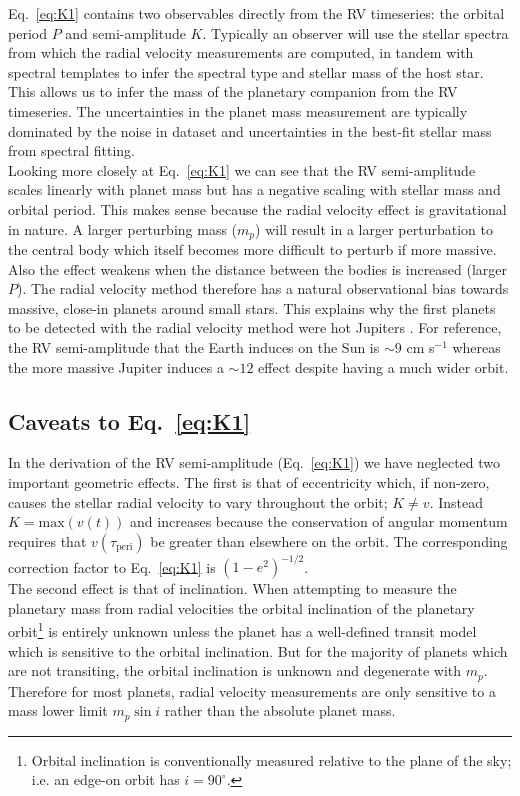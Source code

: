 Eq.~\ref{eq:K1} contains two observables directly from the RV timeseries: the orbital 
period $P$ and semi-amplitude $K$. Typically an observer will use the stellar spectra 
from which the radial velocity measurements are computed, in tandem with spectral 
templates to infer the spectral type and stellar mass of the host star. This allows 
us to infer the mass of the planetary companion from the RV timeseries. The uncertainties 
in the planet mass 
measurement are typically dominated by the noise in dataset and uncertainties in 
the best-fit stellar mass from spectral fitting. \\

Looking more closely at Eq.~\ref{eq:K1} we can see that the RV semi-amplitude scales 
linearly with planet mass but has a negative scaling with stellar mass and orbital 
period. This makes sense because the radial velocity effect is gravitational in 
nature. A larger perturbing mass ($m_p$) will result in a larger perturbation to the 
central body which itself becomes more difficult to perturb if more massive. Also the 
effect weakens when the distance between the bodies is increased (larger $P$). The 
radial velocity method therefore has a natural observational bias towards massive, 
close-in planets around small stars. This explains why the first planets to be 
detected with the radial velocity method were hot Jupiters 
\parencite[e.g.][]{mayor95}. For reference, the RV semi-amplitude that the Earth 
induces on the Sun is $\sim 9$ cm s$^{-1}$ whereas the more massive Jupiter induces a 
$\sim 12$ \mps{} effect despite having a much wider orbit.

\subsection{Caveats to Eq.~\ref{eq:K1}}
In the derivation of the RV semi-amplitude (Eq.~\ref{eq:K1}) we have neglected two 
important geometric effects. The first is that of eccentricity which, if non-zero, 
causes the stellar radial velocity to vary throughout the orbit; $K \ne v$. Instead 
$K = \mathrm{max}(v(t))$ and increases because the conservation of angular momentum 
requires that $v(\tau_{\mathrm{peri}})$ 
be greater than elsewhere on the orbit. The corresponding correction 
factor to Eq.~\ref{eq:K1} is $(1-e^2)^{-1/2}$. \\

The second effect is that of inclination. When attempting to measure the planetary 
mass from radial velocities the orbital inclination of the planetary orbit\footnote{Orbital 
inclination is conventionally measured  relative 
to the plane of the sky; i.e. an edge-on orbit has $i=90^{\circ}$.} is entirely unknown 
unless the planet has a well-defined transit model which is sensitive to the orbital 
inclination. But for the majority of planets which are not transiting, the orbital inclination 
is unknown and degenerate with $m_p$. Therefore for most planets, radial velocity measurements 
are only sensitive to a mass lower limit $m_p\sin{i}$ rather than the absolute planet mass. \\

